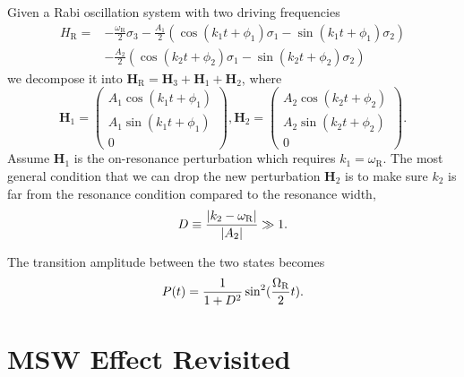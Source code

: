 Given a Rabi oscillation system with two driving frequencies
\begin{align*}
    H_{\mathrm R} =& -\frac{\omega_{\mathrm R}}{2}\sigma_3 - \frac{A_{1} }{2}  \left( \cos(k_{1} t +\phi_{1})\sigma_1  - \sin(k_{1} t +\phi_{1}) \sigma_2\right) \nonumber\\
    & - \frac{A_{2} }{2}  \left( \cos(k_{2} t +\phi_{2})\sigma_1  - \sin(k_{2} t +\phi_{2}) \sigma_2\right)
\end{align*}
we decompose it into $\mathbf{H}_{\mathrm R}=\mathbf{H}_3 + \mathbf{H}_{1} + \mathbf{H}_2$, where
\begin{equation*}
    \mathbf{H}_1 =  \begin{pmatrix}
     A_{1} \cos(k_{1}t+\phi_{1}) \\
     A_{1} \sin(k_{1}t+\phi_{1})  \\
     0
      \end{pmatrix},   \mathbf{H}_2 =  \begin{pmatrix}
     A_{2} \cos(k_{2}t+\phi_{2}) \\
     A_{2} \sin(k_{2}t+\phi_{2})  \\
     0
      \end{pmatrix}.
\end{equation*}
Assume $\mathbf{H}_1$ is the on-resonance perturbation which requires $k_1 = \omega_{\mathrm{R}}$. The most general condition that we can drop the new perturbation $\mathbf{H}_2$ is to make sure $k_2$ is far from the resonance condition compared to the resonance width,
\begin{equation}
D \equiv \frac{\lvert k_2 -\omega_{\mathrm R}\rvert}{\lvert A_2\rvert} \gg 1.
\end{equation}

The transition amplitude between the two states becomes
\begin{equation}
P(t) = \frac{1}{1+D^2}\sin^2(\frac{\Omega_{\mathrm{R}}}{2}t).
\end{equation}








\chapter{\label{app:msw-revisited}MSW Effect Revisited}






